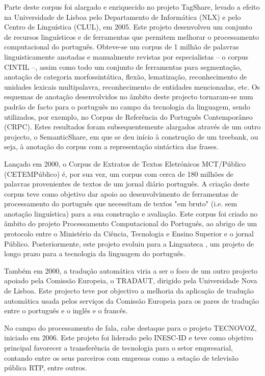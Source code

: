 \begin{multicols}{2}
Parte deste corpus foi alargado e enriquecido no projeto TagShare, levado a efeito na Universidade de Lisboa 
pelo Departamento de Informática (NLX) e pelo Centro de Linguística (CLUL), em 2005. 
Este projeto desenvolveu um conjunto de recursos linguísticos e de ferramentas 
que permitem melhorar o processamento computacional do português. 
Obteve-se um corpus de 1 milhão de palavras linguisticamente anotadas e manualmente revistas por especialistas 
-- o corpus CINTIL \cite{cintil} --, assim como todo um conjunto de ferramentas para segmentação, 
anotação de categoria morfossintática, flexão, lematização, reconhecimento de unidades lexicais multipalavra, 
reconhecimento de entidades mencionadas, etc. 
Os esquemas de anotação desenvolvidos no âmbito deste projecto tornaram-se
num padrão de facto para o português no campo da tecnologia da linguagem, 
sendo utilizados, por exemplo, no Corpus de Referência do Português Contemporâneo (CRPC).
Estes resultados foram subsequentemente alargados através de um outro projecto, o SemanticShare, em
que se deu início à construção de um treebank, ou seja, à anotação do corpus com a representação
sintáctica das frases.

Lançado em 2000, o Corpus de Extratos de Textos Eletrónicos MCT/Público (CETEMPúblico) é, por sua vez, 
um corpus com cerca de 180 milhões de palavras provenientes de textos de um jornal diário português. 
A criação deste corpus teve como objetivo dar apoio ao desenvolvimento de ferramentas de processamento 
do português que necessitam de textos "em bruto" (i.e. sem anotação linguística) para a sua construção e avaliação. 
Este corpus foi criado no âmbito do projeto Processamento Computacional do Português, 
ao abrigo de um protocolo entre o Ministério da Ciência, Tecnologia e Ensino Superior e o jornal Público. 
Posteriormente, este projeto evoluiu para a Linguateca \cite{linguateca}, um projeto de longo prazo para a tecnologia 
da linguagem do português.

Também em 2000, a tradução automática viria a ser o foco de um outro projecto apoiado pela
Comissão Europeia, o TRADAUT, dirigido pela Universidade Nova de Lisboa. Este projecto teve por
objectivo a melhoria da aplicação de tradução automática usada pelos serviços da
Comissão Europeia para os pares de tradução entre o português e o inglês e o francês.

No campo do processamento de fala, cabe destaque para o projeto TECNOVOZ, iniciado em 2006. 
Este projeto foi liderado pelo INESC-ID e teve como objetivo principal favorecer a transferência
de tecnologia para o setor empresarial, contando entre os seus parceiros com empresas como a estação
de televisão pública RTP, entre outros.


\end{multicols}
